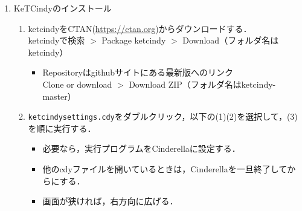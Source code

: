 \documentclass{ujarticle}
\begin{document}
\begin{enumerate}[\bf\large 1.]
\begin{enumerate}[(1)]
\end{enumerate}
 
\item KeTCindyのインストール\vspace{-2mm}
  \begin{enumerate}[(1)]
  \item ketcindyをCTAN(\url{https://ctan.org})からダウンロードする．\\
  \hspace*{10mm}ketcindyで検索 $>$ Package ketcindy $>$ Download（フォルダ名はketcindy）
    \begin{itemize}
    \item Repositoryはgithubサイトにある最新版へのリンク\\
        \hspace*{10mm}Clone or download $>$ Download ZIP（フォルダ名はketcindy-master）          
     \end{itemize}
  \item \verb|ketcindysettings.cdy|をダブルクリック，以下の(1)(2)を選択して，(3)を順に実行する．
    \begin{itemize}
    \item 必要なら，実行プログラムをCinderellaに設定する．
    \item 他のcdyファイルを開いているときは，Cinderellaを一旦終了してからにする．
   \item 画面が狭ければ，右方向に広げる．
   \end{itemize}
  \end{enumerate}



\end{enumerate}
\end{document}
